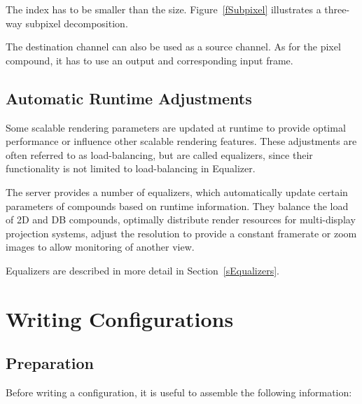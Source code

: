 \documentclass[10pt,a4]{scrartcl}
\newcommand{\fig}[1]{Figure~\ref{#1}}
\newcommand{\sref}[1]{Section~\ref{#1}}
\begin{document}
The \textsf{index} has to be smaller than the \textsf{size}. 
\fig{fSubpixel} illustrates a three-way subpixel decomposition.

The destination channel can also be used as a source channel. 
As for the pixel compound, it has to use an output and corresponding 
input frame.


\subsection{\label{sLoadBalancing}Automatic Runtime Adjustments}

Some scalable rendering parameters are updated at runtime to provide
optimal performance or influence other scalable rendering
features. These adjustments are often referred to as load-balancing, but
are called \textsf{equalizers}, since their functionality is not limited
to load-balancing in Equalizer.

The server provides a number of equalizers, which automatically update
certain parameters of compounds based on runtime information. They
balance the load of 2D and DB compounds, optimally distribute render
resources for multi-display projection systems, adjust the resolution
to provide a constant framerate or zoom images to allow monitoring of
another view.

Equalizers are described in more detail in \sref{sEqualizers}.


\section{\label{sConfig}Writing Configurations}

\subsection{Preparation}

Before writing a configuration, it is useful to assemble the following
information:
\end{document}
